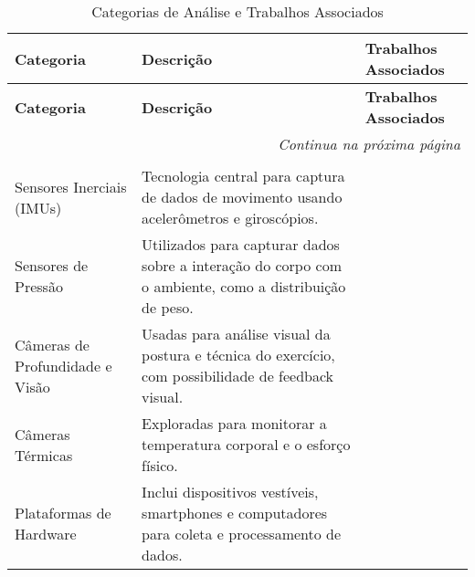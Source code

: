 \documentclass[a4paper,12pt]{article}
\begin{document}
\begin{longtable}{|p{3cm}|p{6cm}|p{3.4cm}|}
    \caption{Categorias de Análise e Trabalhos Associados} \label{tab:categorias} \\

    \hline
    \textbf{Categoria} & \textbf{Descrição} & \textbf{Trabalhos Associados} \\ \hline
    \endfirsthead

    \hline
    \textbf{Categoria} & \textbf{Descrição} & \textbf{Trabalhos Associados} \\ \hline
    \endhead

    \hline
    \multicolumn{3}{r}{\textit{Continua na próxima página}} \\ \hline
    \endfoot

    \hline
    \endlastfoot

    \multicolumn{3}{|c|}{\textbf{Tecnologias}} \\ \hline
    Sensores Inerciais (IMUs) & Tecnologia central para captura de dados de movimento usando acelerômetros e giroscópios. & \cite{Mekruksavanich2024, Johnson2021,Tian2021,papadopoulou2023towards,Gleadhill2019,Asghar2023,Qi2019,Qi2020,Zou2020,Ceccarelli2024} \\ \hline
    Sensores de Pressão & Utilizados para capturar dados sobre a interação do corpo com o ambiente, como a distribuição de peso. & \cite{Krauter2024, Akpa2018} \\ \hline
    Câmeras de Profundidade e Visão & Usadas para análise visual da postura e técnica do exercício, com possibilidade de feedback visual. & \cite{Sharshar2022,Sharshar2023} \\ \hline
    Câmeras Térmicas & Exploradas para monitorar a temperatura corporal e o esforço físico. & \cite{Sharshar2022} \\ \hline
    Plataformas de Hardware & Inclui dispositivos vestíveis, smartphones e computadores para coleta e processamento de dados. & \cite{papadopoulou2023towards, Gleadhill2019, Gandomkar2018} \\ \hline


\end{longtable}
\end{document}
